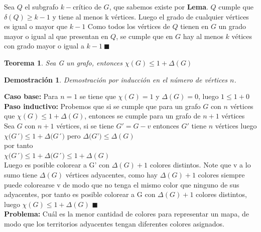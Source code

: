 \documentclass[a4paper,1pt]{report}
\newtheorem*{teo}{Teorema}
\newtheorem*{dem}{Demostración}
\begin{document}
Sea $Q$ el subgrafo $k-$cr\'itico de $G$, que sabemos existe por \textbf{Lema}. $Q$ cumple que $\delta(Q)\geq k-1$ y tiene al menos k vértices. Luego el grado de cualquier vértices es igual o mayor que $k-1$
Como todos los v\'ertices de $Q$ tienen en $G$ un grado mayor o igual al que presentan en $Q$, se cumple que en $G$ hay al menos $k$ v\'etices con grado mayor o igual a $k-1 \ \blacksquare$

\begin{teo}
 Sea G un grafo, entonces $\chi(G)\leq 1 + \Delta(G)$
\end{teo}

\begin{dem}
Demostración por inducción en el número de vértices $n$. 
\end{dem}

\textbf{Caso base:} Para $n=1$ se tiene que $\chi(G)=1$ y $\Delta(G)=0$, luego $1\leq1+0$\\

\textbf{Paso inductivo:} Probemos que si se cumple que para un grafo $G$ con  $n$ v\'ertices que $\chi(G) \leq 1 + \Delta(G)$, entonces se cumple para un grafo de $n+1$ v\'ertices\\

Sea $G$ con $n+1$ vértices, si se tiene $G'=G-v$ entonces $G'$ tiene $n$ vértices luego
$\chi(G$´$)\leq 1 + \Delta(G$´$)$ pero $\Delta(G$'$)\leq \Delta(G)$\\ 
por tanto\\
$\chi(G$´$)\leq 1 + \Delta(G$´$)\leq 1 + \Delta(G) \  $\\

Luego es posible colorear a G' con $\Delta(G)+1$ colores distintos. Note que v a lo sumo tiene $\Delta(G)$ vértices adyacentes, como hay $\Delta(G)+1$ colores siempre puede colorearse v de modo que no tenga el mismo color que ninguno de sus adyacentes, por tanto es posible colorear a G con $\Delta(G)+1$ colores distintos, luego $\chi(G)\leq 1 + \Delta(G)$ $\blacksquare$\\


\textbf{Problema:} Cuál es la menor cantidad de colores para representar un mapa, de modo que los territorios adyacentes tengan diferentes colores asignados.
\end{document}
